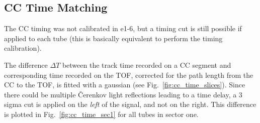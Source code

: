 \clearpage\newpage

\subsection{CC Time Matching}
The CC timing was not calibrated in e1-6, but a timing cut is still possible if applied to each tube
(this is basically equivalent to perform the timing calibration).

The difference $\Delta T$ between the track time recorded on a CC segment and corresponding time recorded on the TOF,
corrected for the path length from the CC to the TOF, is fitted with a gaussian (see Fig.~\ref{fig:cc_time_slices}).
Since there could be multiple \v Cerenkov light reflections leading to a time delay,
a 3 sigma cut is applied on the {\it left} of the signal, and not on the right.
This difference is plotted in Fig.~\ref{fig:cc_time_sec1} for all tubes in sector one.

